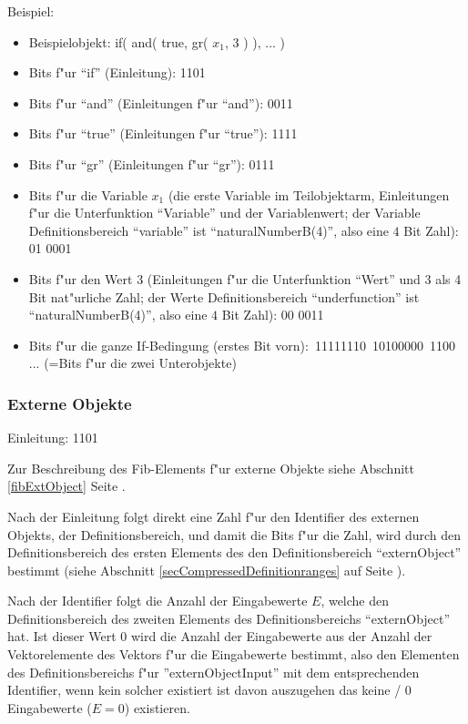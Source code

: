 \bigskip\noindent
Beispiel:
\begin{itemize}
 \item Beispielobjekt: if( and( true, gr( $x_1$, 3 ) ), ... )
 \item Bits f"ur ``if'' (Einleitung): 1101
 \item Bits f"ur ``and'' (Einleitungen f"ur ``and''): 0011
 \item Bits f"ur ``true'' (Einleitungen f"ur ``true''): 1111
 \item Bits f"ur ``gr'' (Einleitungen f"ur ``gr''): 0111
 \item Bits f"ur die Variable $x_1$ (die erste Variable im Teilobjektarm, Einleitungen f"ur die Unterfunktion ``Variable'' und der Variablenwert; der Variable Definitionsbereich ``variable'' ist ``naturalNumberB(4)'', also eine $4$ Bit Zahl): 01 0001
 \item Bits f"ur den Wert 3 (Einleitungen f"ur die Unterfunktion ``Wert'' und 3 als 4 Bit nat"urliche Zahl; der Werte Definitionsbereich ``underfunction'' ist ``naturalNumberB(4)'', also eine $4$ Bit Zahl): 00 0011
 \item Bits f"ur die ganze If-Bedingung (erstes Bit vorn):\ 11111110\ 10100000\ 1100 ... (=Bits f"ur die zwei Unterobjekte)
\end{itemize}



\subsubsection{Externe Objekte}
\label{secCompressedExternObjects}

Einleitung: 1101

\bigskip\noindent
Zur Beschreibung des Fib-Elements f"ur externe Objekte siehe Abschnitt \ref{fibExtObject} Seite \pageref{fibExtObject} .

Nach der Einleitung folgt direkt eine Zahl f"ur den Identifier des externen Objekts, der Definitionsbereich, und damit die Bits f"ur die Zahl, wird durch den Definitionsbereich des ersten Elements des den Definitionsbereich ``externObject'' bestimmt (siehe Abschnitt \ref{secCompressedDefinitionranges} auf Seite \pageref{secCompressedDefinitionranges}).

Nach der Identifier folgt die Anzahl der Eingabewerte $E$, welche den Definitionsbereich des zweiten Elements des Definitionsbereichs ``externObject'' hat. Ist dieser Wert $0$ wird die Anzahl der Eingabewerte aus der Anzahl der Vektorelemente des Vektors f"ur die Eingabewerte bestimmt, also den Elementen des Definitionsbereichs f"ur ''externObjectInput'' mit dem entsprechenden Identifier, wenn kein solcher existiert ist davon auszugehen das keine / $0$ Eingabewerte ($E=0$) existieren.


